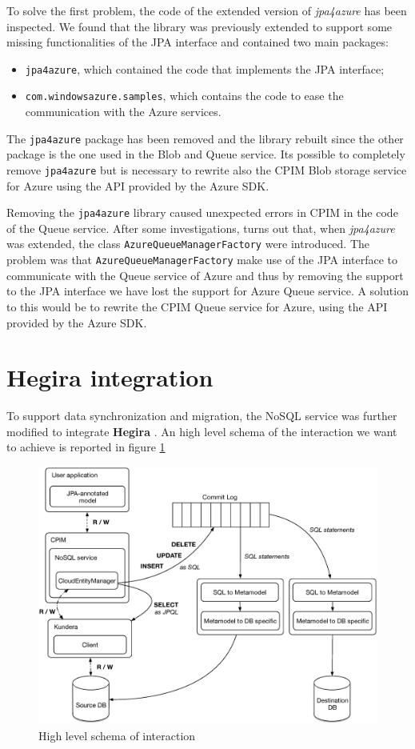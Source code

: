 \noindent To solve the first problem, the code of the extended version of \textit{jpa4azure} has been inspected. We found that the library was previously extended to support some missing functionalities of the JPA interface and contained two main packages:
\begin{itemize}
\item \texttt{jpa4azure}, which contained the code that implements the JPA interface;
\item \texttt{com.windowsazure.samples}, which contains the code to ease the communication with the Azure services.
\end{itemize}
The \texttt{jpa4azure} package has been removed and the library rebuilt since the other package is the one used in the Blob and Queue service. Its possible to completely remove \texttt{jpa4azure} but is necessary to rewrite also the CPIM Blob storage service for Azure using the API provided by the Azure SDK.

\newparagraph Removing the \texttt{jpa4azure} library caused unexpected errors in CPIM in the code of the Queue service. After some investigations, turns out that, when \textit{jpa4azure} was extended, the class \texttt{AzureQueueManagerFactory} were introduced.
The problem was that \texttt{AzureQueueManagerFactory} make use of the JPA interface to communicate with the Queue service of Azure and thus by removing the support to the JPA interface we have lost the support for Azure Queue service.
A solution to this would be to rewrite the CPIM Queue service for Azure, using the API provided by the Azure SDK.

\section{Hegira integration}
\label{sec:hegira}
To support data synchronization and migration, the NoSQL service was further modified to integrate \textbf{Hegira} \cite{thesis:marco}. An high level schema of the interaction we want to achieve is reported in figure \ref{fig:high-level-interaction}

\begin{figure}[tbh]
  \centering
  \includegraphics[width=12cm]{images/high_level_interaction}
  \caption{High level schema of interaction}
  \label{fig:high-level-interaction}
\end{figure} 

